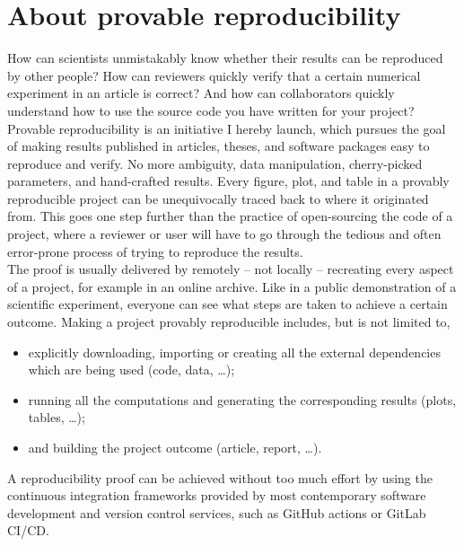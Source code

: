 \chapter*{About provable reproducibility}
\label{chp:0-reproducibility}

How can scientists unmistakably know whether their results can be reproduced
by other people? How can reviewers quickly verify that a certain numerical
experiment in an article is correct? And how can collaborators quickly
understand how to use the source code you have written for your project?\\

Provable reproducibility is an initiative I hereby launch, which pursues the
goal of making results published in articles, theses, and software packages easy to
reproduce and verify. No more ambiguity, data manipulation, cherry-picked
parameters, and hand-crafted results. Every figure, plot, and table
in a provably reproducible project can be unequivocally traced back to where
it originated from. This goes one step further than the practice of open-sourcing
the code of a project, where a reviewer or user will have to go through the
tedious and often error-prone process of trying to reproduce the results.\\

The proof is usually delivered by remotely -- not locally -- recreating every aspect of a
project, for example in an online archive. Like in a public demonstration of a scientific
experiment, everyone can see what steps are taken to achieve a certain outcome.
Making a project provably reproducible includes, but is not limited to,
\begin{itemize}
    \item explicitly downloading, importing or creating all the external dependencies which are being used (code, data, \dots);
    \item running all the computations and generating the corresponding results (plots, tables, \dots);
    \item and building the project outcome (article, report, \dots).
\end{itemize}
A reproducibility proof can be achieved without too much effort by
using the continuous integration frameworks provided by most contemporary
software development and version control services, such as GitHub actions or
GitLab CI/CD.

